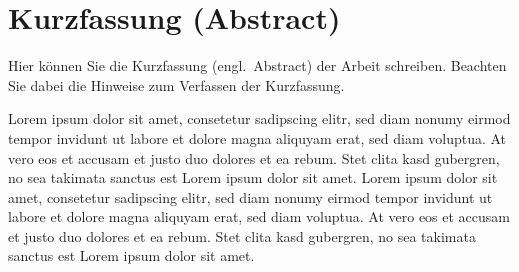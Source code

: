 
\chapter*{Kurzfassung (Abstract)}

Hier können Sie die Kurzfassung (engl.~Abstract) der Arbeit schreiben. Beachten Sie dabei die Hinweise zum Verfassen der Kurzfassung.

Lorem ipsum dolor sit amet, consetetur sadipscing elitr, sed diam nonumy eirmod tempor invidunt ut labore et dolore magna aliquyam erat, 
sed diam voluptua. At vero eos et accusam et justo duo dolores et ea rebum. Stet clita kasd gubergren, no sea takimata sanctus est Lorem 
ipsum dolor sit amet. Lorem ipsum dolor sit amet, consetetur sadipscing elitr, sed diam nonumy eirmod tempor invidunt ut labore et dolore 
magna aliquyam erat, sed diam voluptua. At vero eos et accusam et justo duo dolores et ea rebum. Stet clita kasd gubergren, no sea takimata 
sanctus est Lorem ipsum dolor sit amet.
